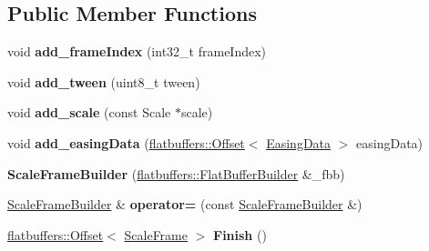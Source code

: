 \subsection*{Public Member Functions}
\begin{DoxyCompactItemize}
\item 
\mbox{\label{structflatbuffers_1_1ScaleFrameBuilder_a6e1f6ef496a8056929e229139ac0a701}} 
void {\bfseries add\+\_\+frame\+Index} (int32\+\_\+t frame\+Index)
\item 
\mbox{\label{structflatbuffers_1_1ScaleFrameBuilder_a684bc3fa9f6a0b917794cabecedb3028}} 
void {\bfseries add\+\_\+tween} (uint8\+\_\+t tween)
\item 
\mbox{\label{structflatbuffers_1_1ScaleFrameBuilder_acf4b6a253a2a4e965d95cc016ddd934c}} 
void {\bfseries add\+\_\+scale} (const Scale $\ast$scale)
\item 
\mbox{\label{structflatbuffers_1_1ScaleFrameBuilder_a519f259376edba51d938788238f8ffaf}} 
void {\bfseries add\+\_\+easing\+Data} (\hyperlink{structflatbuffers_1_1Offset}{flatbuffers\+::\+Offset}$<$ \hyperlink{structflatbuffers_1_1EasingData}{Easing\+Data} $>$ easing\+Data)
\item 
\mbox{\label{structflatbuffers_1_1ScaleFrameBuilder_a1a935dc9e1accabfa6443d5815330c10}} 
{\bfseries Scale\+Frame\+Builder} (\hyperlink{classflatbuffers_1_1FlatBufferBuilder}{flatbuffers\+::\+Flat\+Buffer\+Builder} \&\+\_\+fbb)
\item 
\mbox{\label{structflatbuffers_1_1ScaleFrameBuilder_a416785d5c3da1a0337444a26074cf95f}} 
\hyperlink{structflatbuffers_1_1ScaleFrameBuilder}{Scale\+Frame\+Builder} \& {\bfseries operator=} (const \hyperlink{structflatbuffers_1_1ScaleFrameBuilder}{Scale\+Frame\+Builder} \&)
\item 
\mbox{\label{structflatbuffers_1_1ScaleFrameBuilder_a9b234773a5bbde837b9a4db60e75f4a8}} 
\hyperlink{structflatbuffers_1_1Offset}{flatbuffers\+::\+Offset}$<$ \hyperlink{structflatbuffers_1_1ScaleFrame}{Scale\+Frame} $>$ {\bfseries Finish} ()

\end{DoxyCompactItemize}
